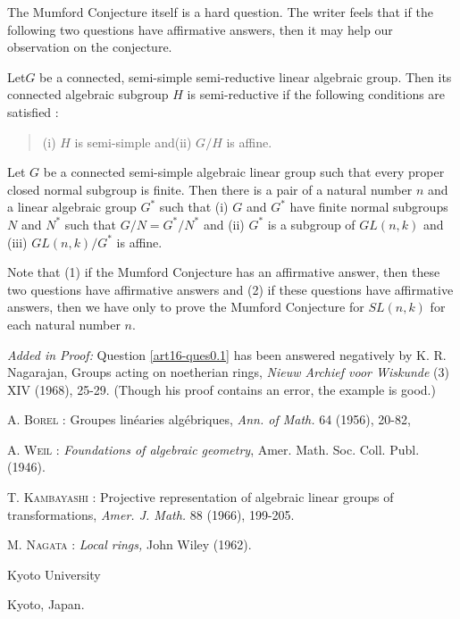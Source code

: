 The Mumford Conjecture itself is a hard question. The writer feels that if the following two questions have affirmative answers, then it may help our observation on the conjecture.

\begin{question}\label{art16-ques5.4}
Let\pageoriginale $G$ be a connected, semi-simple semi-reductive linear algebraic group. Then its connected algebraic subgroup $H$ is semi-reductive if the following conditions are satisfied :
\begin{quote}
(i) $H$ is semi-simple and\quad (ii) $G/H$ is affine.
\end{quote}
\end{question}

\begin{question}\label{art16-ques5.5}
Let $G$ be a connected semi-simple algebraic linear group such that every proper closed normal subgroup is finite. Then there is a pair of a natural number $n$ and a linear algebraic group $G^{*}$ such that (i) $G$ and $G^{*}$ have finite normal subgroups $N$ and $N^{*}$ such that $G/N=G^{*}/N^{*}$ and (ii) $G^{*}$ is a subgroup of $GL(n,k)$ and (iii) $GL(n,k)/G^{*}$ is affine.
\end{question}

Note that (1) if the Mumford Conjecture has an affirmative answer, then these two questions have affirmative answers and (2) if these questions have affirmative answers, then we have only to prove the Mumford Conjecture for $SL(n,k)$ for each natural number $n$.

{\em Added in Proof:} Question \ref{art16-ques0.1} has been answered negatively by K. R. Nagarajan, Groups acting on noetherian rings, {\em Nieuw Archief voor Wiskunde} (3) XIV (1968), 25-29. (Though his proof contains an error, the example is good.)

\bigskip

\begin{thebibliography}{99}
 \textsc{A. Borel :} Groupes lin\'earies alg\'ebriques, {\em Ann. of Math.} 64 (1956), 20-82,

 \textsc{A. Weil :} {\em Foundations of algebraic geometry}, Amer. Math. Soc. Coll. Publ. (1946).

 \textsc{T. Kambayashi :} Projective representation of algebraic linear groups of transformations, {\em Amer. J. Math.} 88 (1966), 199-205.

 \textsc{M. Nagata :} {\em Local rings,} John Wiley (1962).
\end{thebibliography}

\bigskip

\noindent
{\small Kyoto University}

\noindent
{\small Kyoto, Japan.}



